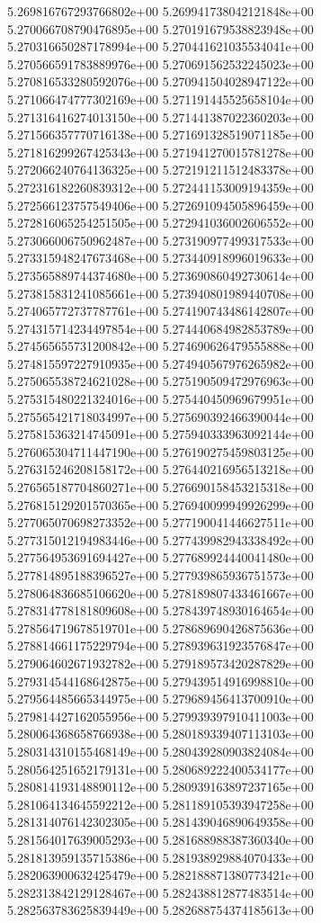 5.269816767293766802e+00
5.269941738042121848e+00
5.270066708790476895e+00
5.270191679538823948e+00
5.270316650287178994e+00
5.270441621035534041e+00
5.270566591783889976e+00
5.270691562532245023e+00
5.270816533280592076e+00
5.270941504028947122e+00
5.271066474777302169e+00
5.271191445525658104e+00
5.271316416274013150e+00
5.271441387022360203e+00
5.271566357770716138e+00
5.271691328519071185e+00
5.271816299267425343e+00
5.271941270015781278e+00
5.272066240764136325e+00
5.272191211512483378e+00
5.272316182260839312e+00
5.272441153009194359e+00
5.272566123757549406e+00
5.272691094505896459e+00
5.272816065254251505e+00
5.272941036002606552e+00
5.273066006750962487e+00
5.273190977499317533e+00
5.273315948247673468e+00
5.273440918996019633e+00
5.273565889744374680e+00
5.273690860492730614e+00
5.273815831241085661e+00
5.273940801989440708e+00
5.274065772737787761e+00
5.274190743486142807e+00
5.274315714234497854e+00
5.274440684982853789e+00
5.274565655731200842e+00
5.274690626479555888e+00
5.274815597227910935e+00
5.274940567976265982e+00
5.275065538724621028e+00
5.275190509472976963e+00
5.275315480221324016e+00
5.275440450969679951e+00
5.275565421718034997e+00
5.275690392466390044e+00
5.275815363214745091e+00
5.275940333963092144e+00
5.276065304711447190e+00
5.276190275459803125e+00
5.276315246208158172e+00
5.276440216956513218e+00
5.276565187704860271e+00
5.276690158453215318e+00
5.276815129201570365e+00
5.276940099949926299e+00
5.277065070698273352e+00
5.277190041446627511e+00
5.277315012194983446e+00
5.277439982943338492e+00
5.277564953691694427e+00
5.277689924440041480e+00
5.277814895188396527e+00
5.277939865936751573e+00
5.278064836685106620e+00
5.278189807433461667e+00
5.278314778181809608e+00
5.278439748930164654e+00
5.278564719678519701e+00
5.278689690426875636e+00
5.278814661175229794e+00
5.278939631923576847e+00
5.279064602671932782e+00
5.279189573420287829e+00
5.279314544168642875e+00
5.279439514916998810e+00
5.279564485665344975e+00
5.279689456413700910e+00
5.279814427162055956e+00
5.279939397910411003e+00
5.280064368658766938e+00
5.280189339407113103e+00
5.280314310155468149e+00
5.280439280903824084e+00
5.280564251652179131e+00
5.280689222400534177e+00
5.280814193148890112e+00
5.280939163897237165e+00
5.281064134645592212e+00
5.281189105393947258e+00
5.281314076142302305e+00
5.281439046890649358e+00
5.281564017639005293e+00
5.281688988387360340e+00
5.281813959135715386e+00
5.281938929884070433e+00
5.282063900632425479e+00
5.282188871380773421e+00
5.282313842129128467e+00
5.282438812877483514e+00
5.282563783625839449e+00
5.282688754374185613e+00
